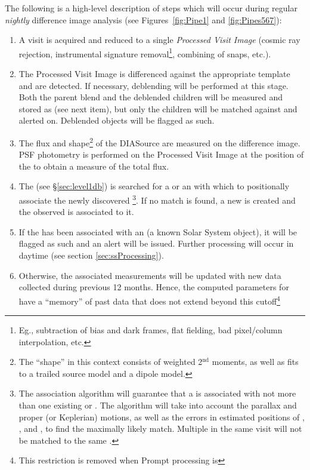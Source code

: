 \documentclass[SE,lsstdraft,toc]{lsstdoc}
\begin{document}
The following is a high-level description of steps which will occur during regular \emph{nightly}
difference image analysis (see Figures~\ref{fig:Pipe1} and \ref{fig:Pipes567}):
\begin{enumerate}
\item A visit is acquired and reduced to a single \emph{Processed Visit Image} (cosmic ray rejection, instrumental signature removal\footnote{Eg., subtraction of bias and dark frames, flat fielding, bad pixel/column interpolation, etc.}, combining of snaps, etc.).
\item The Processed Visit Image is differenced against the appropriate template and \DIASources are detected. If necessary, deblending will be performed at this stage. Both the parent blend and the deblended children will be measured and stored as \DIASources (see next item), but only the children will be matched against \DIAObjects and alerted on. Deblended objects will be flagged as such.
\item The flux and shape\footnote{The ``shape'' in this context consists of weighted 2$^\mathrm{nd}$ moments, as well as fits to a trailed source model and a dipole model.} of the DIASource are measured on the difference image. PSF photometry is performed on the Processed Visit Image at the position of the \DIASource to obtain a measure of the total flux.
\item The \PPDB (see \S \ref{sec:level1db}) is searched for a \DIAObject or an \SSObject with which to positionally associate the newly discovered \DIASource\footnote{The association algorithm will guarantee that a \DIASource is associated with not more than one existing \DIAObject or \SSObject. The algorithm will take into account the parallax and proper (or Keplerian) motions, as well as the errors in estimated positions of \DIAObject, \SSObject, and \DIASource, to find the maximally likely match. Multiple \DIASources in the same visit will not be matched to the same \DIAObject.}. If no match is found, a new \DIAObject is created and the observed \DIASource is associated to it.
\item If the \DIASource has been associated with an \SSObject (a known Solar System object), it will be flagged as such and an alert will be issued. Further processing will occur in daytime (see section \ref{sec:ssProcessing}).
\item Otherwise, the associated \DIAObject measurements will be updated with new data
collected during previous 12 months. Hence, the computed parameters for \DIAObjects have a ``memory'' of past data that does not extend beyond this cutoff\footnote{This restriction is removed when Prompt processing is
}
\end{enumerate}
\end{document}
